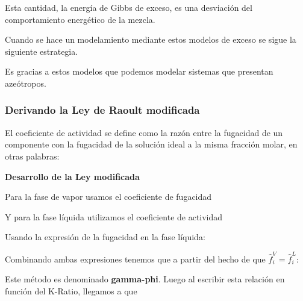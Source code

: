 Esta cantidad, la energía de Gibbs de exceso, es una desviación del comportamiento energético de la mezcla.

Cuando se hace un modelamiento mediante estos modelos de exceso se sigue la siguiente estrategia.

Es gracias a estos modelos que podemos modelar sistemas que presentan azeótropos.

\subsubsection{Derivando la Ley de Raoult modificada}

El coeficiente de actividad se define como la razón entre la fugacidad de un componente con la fugacidad de la solución ideal a la misma fracción molar, en otras palabras:


\textbf{Desarrollo de la Ley modificada}

Para la fase de vapor usamos el coeficiente de fugacidad


Y para la fase líquida utilizamos el coeficiente de actividad


Usando la expresión de la fugacidad en la fase líquida:


Combinando ambas expresiones tenemos que a partir del hecho de que $\hat{f}_i^{V}=\hat{f}_i^{L}$:


Este método es denominado \textbf{gamma-phi}. Luego al escribir esta relación en función del K-Ratio, llegamos a que 

